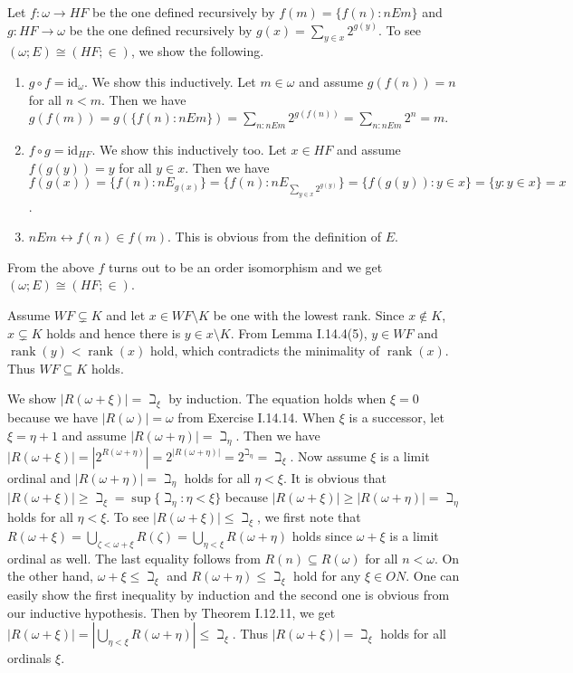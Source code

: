 \documentclass[12pt]{article}
\newcommand{\rank}{\mathop{\mathrm{rank}}}
\theoremstyle{definition}
\newenvironment{customthm}[1]
  {\renewcommand\theinnercustomthm{#1}\innercustomthm}
  {\endinnercustomthm}
\begin{document}
\begin{customthm}{I.14.14} Let $f:\omega\rightarrow HF$ be the one defined recursively by $f(m)=\{f(n):nEm\}$ and $g:HF\rightarrow\omega$ be the one defined recursively by $g(x)=\sum_{y\in x}2^{g(y)}$. To see $(\omega;E)\cong(HF;\in)$, we show the following.
\begin{enumerate}
\item\underline{$g\circ f = \mathrm{id}_\omega$}. We show this inductively. Let $m\in\omega$ and assume $g(f(n))=n$ for all $n<m$. Then we have $g(f(m))=g(\{f(n):nEm\})=\sum_{n:nEm}2^{g(f(n))}=\sum_{n:nEm}2^n=m$.
\item\underline{$f\circ g = \mathrm{id}_{HF}$}. We show this inductively too. Let $x\in HF$ and assume $f(g(y))=y$ for all $y\in x$. Then we have $f(g(x))=\{f(n):nE_{g(x)}\}=\{f(n):nE_{\sum_{y\in x}2^{g(y)}}\}=\{f(g(y)):y\in x\}=\{y:y\in x\}=x$.
\item\underline{$nEm\leftrightarrow f(n)\in f(m)$}. This is obvious from the definition of $E$.
\end{enumerate}
From the above $f$ turns out to be an order isomorphism and we get $(\omega;E)\cong(HF;\in)$.
\end{customthm}

\begin{customthm}{I.14.15} Assume $WF\subsetneq K$ and let $x\in WF\setminus K$ be one with the lowest rank. Since $x\not\in K$, $x\subsetneq K$ holds and hence there is $y\in x\setminus K$. From Lemma I.14.4(5), $y\in WF$ and $\rank(y)<\rank(x)$ hold, which contradicts the minimality of $\rank(x)$. Thus $WF\subseteq K$ holds.
\end{customthm}

\begin{customthm}{I.14.16} We show $|R(\omega+\xi)|=\beth_\xi$ by induction. The equation holds when $\xi=0$ because we have $|R(\omega)|=\omega$ from Exercise I.14.14. When $\xi$ is a successor, let $\xi=\eta+1$ and assume $|R(\omega+\eta)|=\beth_\eta$. Then we have $|R(\omega+\xi)|=|2^{R(\omega+\eta)}|=2^{|R(\omega+\eta)|}=2^{\beth_\eta}=\beth_\xi$. Now assume $\xi$ is a limit ordinal and $|R(\omega+\eta)|=\beth_\eta$ holds for all $\eta<\xi$. It is obvious that $|R(\omega+\xi)|\geq\beth_\xi=\sup\{\beth_\eta:\eta<\xi\}$ because $|R(\omega+\xi)|\geq|R(\omega+\eta)|=\beth_\eta$ holds for all $\eta<\xi$. To see $|R(\omega+\xi)|\leq\beth_\xi$, we first note that $R(\omega+\xi)=\bigcup_{\zeta<\omega+\xi}R(\zeta)=\bigcup_{\eta<\xi}R(\omega+\eta)$ holds since $\omega+\xi$ is a limit ordinal as well. The last equality follows from $R(n)\subseteq R(\omega)$ for all $n<\omega$. On the other hand, $\omega+\xi\leq\beth_\xi$ and $R(\omega+\eta)\leq\beth_\xi$ hold for any $\xi\in ON$. One can easily show the first inequality by induction and the second one is obvious from our inductive hypothesis. Then by Theorem I.12.11, we get $|R(\omega+\xi)|=|\bigcup_{\eta<\xi}R(\omega+\eta)|\leq\beth_\xi$. Thus $|R(\omega+\xi)|=\beth_\xi$ holds for all ordinals $\xi$.
\end{customthm}
\end{document}
